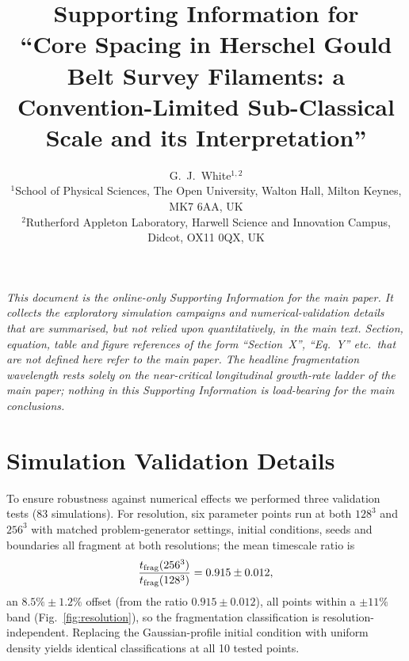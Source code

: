 \documentclass[usenatbib,twoside,twocolumn]{mnras}
\title[Core spacing in HGBS filaments --- Supporting Information]{Supporting Information for \\ ``Core Spacing in Herschel Gould Belt Survey Filaments: a Convention-Limited Sub-Classical Scale and its Interpretation''}
\author[G.~J.~White]{G.~J.~White$^{1,2}$\\
$^{1}$School of Physical Sciences, The Open University, Walton Hall, Milton Keynes, MK7 6AA, UK\\
$^{2}$Rutherford Appleton Laboratory, Harwell Science and Innovation Campus, Didcot, OX11 0QX, UK}
\begin{document}
\maketitle

\noindent\emph{This document is the online-only Supporting Information for the main paper. It collects the exploratory simulation campaigns and numerical-validation details that are summarised, but not relied upon quantitatively, in the main text. Section, equation, table and figure references of the form ``Section~X'', ``Eq.~Y'' etc.\ that are not defined here refer to the main paper. The headline fragmentation wavelength rests solely on the near-critical longitudinal growth-rate ladder of the main paper; nothing in this Supporting Information is load-bearing for the main conclusions.}

\appendix
\setcounter{section}{0}
\renewcommand{\thesection}{S\arabic{section}}

\section{Simulation Validation Details}
\label{sec:validation}

To ensure robustness against numerical effects we performed three validation tests (83 simulations). For resolution, six parameter points run at both $128^3$ and $256^3$ with matched problem-generator settings, initial conditions, seeds and boundaries all fragment at both resolutions; the mean timescale ratio is
\begin{equation}
\frac{t_{\rm frag}(256^3)}{t_{\rm frag}(128^3)} = 0.915 \pm 0.012,
\end{equation}
an $8.5\%\pm1.2\%$ offset (from the ratio $0.915\pm0.012$), all points within a $\pm11\%$ band (Fig.~\ref{fig:resolution}), so the fragmentation classification is resolution-independent. Replacing the Gaussian-profile initial condition with uniform density yields identical classifications at all 10 tested points.
\end{document}
